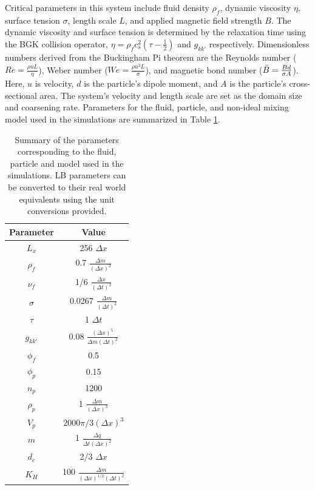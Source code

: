 Critical parameters in this system include fluid density $\rho_f$, dynamic viscosity $\eta$, surface tension $\sigma$, 
length scale $L$, and applied magnetic field strength $B$. The dynamic viscosity and surface tension is determined 
by the relaxation time using the BGK collision operator, $\eta = \rho_f c_s^2(\tau - \frac{1}{2})$ and $g_{kk'}$ 
respectively. Dimensionless numbers derived from the Buckingham Pi theorem are the Reynolds number
($Re = \frac{\rho u L}{\eta}$), Weber number ($We = \frac{\rho u^2 L}{\sigma}$), and magnetic bond number 
($\Bar{B} = \frac{Bd}{\sigma A}$). Here, $u$ is velocity, $d$ is the particle's dipole moment, and $A$ is the 
particle's cross-sectional area. The system's velocity and length scale are set as the domain size and coarsening rate. 
Parameters for the fluid, particle, and non-ideal mixing model used in the simulations are summarized in Table 
\ref{table:model_params}.

\begin{table}
    \centering
    \caption{Summary of the parameters corresponding to the fluid, particle and model used in the simulations. 
             LB parameters can be converted to their real world equivalents using the unit conversions provided.}
    \label{table:model_params}
    \begin{tabular}{|c|c|}
    \hline
    Parameter & Value \\ [0.5ex] 
    \hline\hline
    $L_x$ & 256 $\Delta x$ \\
    $\rho_f$ & 0.7 $ \frac{\Delta m}{(\Delta x)^3}$\\
    $\nu_f$ & 1/6 $\frac{\Delta x}{(\Delta t)^2}$ \\
    $\sigma $ & 0.0267 $\frac{\Delta m}{(\Delta t)^2}$ \\
    $\tau$ & 1 $\Delta t$\\
    $g_{kk'}$ & 0.08 $\frac{(\Delta x)^5}{\Delta m(\Delta t)^2}$\\
    $\phi_f$ & 0.5 \\
    $\phi_p$ & 0.15 \\
    $n_p$ & 1200 \\
    $\rho_p$ & 1 $ \frac{\Delta m}{(\Delta x)^3}$\\
    $V_p$ & $2000\pi/3 (\Delta x)^3$ \\
    $m$ & 1 $\frac{\Delta q}{\Delta t(\Delta x)^2}$\\
    $d_c$ & 2/3 $\Delta x$ \\
    $K_H$ & 100 $\frac{\Delta m}{(\Delta x)^{1/2}(\Delta t)^2} $\\
    \hline
    \end{tabular}
\end{table}


